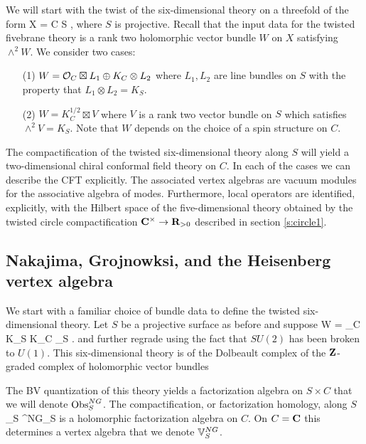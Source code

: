 \documentclass[11pt]{amsart}
\begin{document}
We will start with the twist of the six-dimensional theory on a threefold of the form 
\beqn
X = C \times S ,
\eeqn
where $S$ is projective.
Recall that the input data for the twisted fivebrane theory is a rank two holomorphic vector bundle $W$ on $X$ satisfying $\wedge^2 W$.
We consider two cases:
\begin{itemize}
\item[(1)] $W = \mathcal O_C \boxtimes L_1 \oplus K_C \otimes L_2$ where $L_1,L_2$ are line bundles on $S$ with the property that $L_1 \otimes L_2 = K_S$.
\item[(2)] $W = K^{1/2}_C \boxtimes V$ where $V$ is a rank two vector bundle on $S$ which satisfies $\wedge^2 V = K_S$. Note that $W$ depends on the choice of a spin structure on $C$.
\end{itemize}

The compactification of the twisted six-dimensional theory along $S$ will yield a two-dimensional chiral conformal field theory on $C$.
In each of the cases we can describe the CFT explicitly.
The associated vertex algebras are vacuum modules for the associative algebra of modes.
Furthermore, local operators are identified, explicitly, with the Hilbert space of the five-dimensional theory obtained by the twisted circle compactification $\mathbf{C}^\times \to \mathbf{R}_{>0}$ described in section \ref{s:circle1}.

\subsection{Nakajima, Grojnowksi, and the Heisenberg vertex algebra}

We start with a familiar choice of bundle data to define the twisted six-dimensional theory.
Let $S$ be a projective surface as before and suppose
\beqn
W = \cO_C \boxtimes K_S \oplus K_C \boxtimes \cO_S .
\eeqn
and further regrade using the fact that $SU(2)$ has been broken to $U(1)$. 
This six-dimensional theory is of the Dolbeault complex of the $\mathbf{Z}$-graded complex of holomorphic vector bundles
\beqn
{} 
\eeqn
The BV quantization of this theory yields a factorization algebra on $S \times C$ that we will denote ${\rm Obs}_{S}^{NG}$.
The compactification, or factorization homology, along $S$
\beqn
\int_S \Obs^{NG}_{S}
\eeqn
is a holomorphic factorization algebra on $C$.
On $C = \mathbf{C}$ this determines a vertex algebra that we denote $\mathbb V_{S}^{NG}$.
\end{document}
